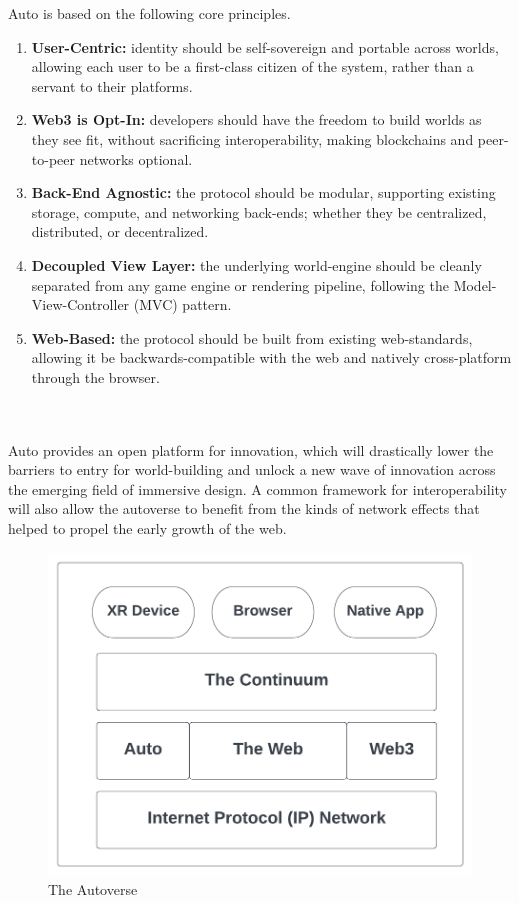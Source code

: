 \documentclass[twocolumn, 10pt]{article}
\begin{document}
Auto is based on the following core principles.

\begin{enumerate}
    \item \textbf{User-Centric:} identity should be self-sovereign and portable across worlds, allowing each user to be a first-class citizen of the system, rather than a servant to their platforms.
    \item \textbf{Web3 is Opt-In:} developers should have the freedom to build worlds as they see fit, without sacrificing interoperability, making blockchains and peer-to-peer networks optional.
    \item \textbf{Back-End Agnostic:} the protocol should be modular, supporting existing storage, compute, and networking back-ends; whether they be centralized, distributed, or decentralized.
    \item \textbf{Decoupled View Layer:} the underlying world-engine should be cleanly separated from any game engine or rendering pipeline, following the Model-View-Controller (MVC) pattern.
    \item \textbf{Web-Based:} the protocol should be built from existing web-standards, allowing it be backwards-compatible with the web and natively cross-platform through the browser.
\end{enumerate}
\\\\
Auto provides an open platform for innovation, which will drastically lower the barriers to entry for world-building and unlock a new wave of innovation across the emerging field of immersive design.  A common framework for interoperability will also allow the autoverse to benefit from the kinds of network effects that helped to propel the early growth of the web.

\begin{figure}[h]
    \centering
    \includegraphics{images/autoverse.png}
    \caption{The Autoverse}
    \label{fig:my_label}
\end{figure}
\end{document}
